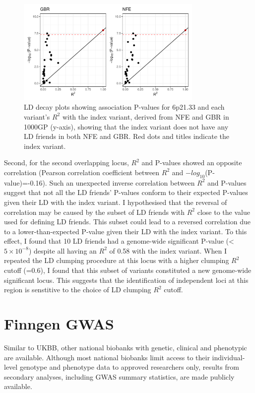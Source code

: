   \begin{figure}[H] 
    \centering    
    \includegraphics[width=0.8\textwidth]{ukbb_ld_decay_nfe_vs_gbr}
    \caption[Figure]{LD decay plots showing association P-values for 6p21.33 and each variant's $R^{2}$ with the index variant, derived from NFE and GBR in 1000GP (y-axis), showing that the index variant does not have any LD friends in both NFE and GBR. Red dots and titles indicate the index variant.}
    \label{fig:ukbb_ld_decay_nfe_vs_gbr}
    \end{figure}

  Second, for the second overlapping locus, $R^{2}$ and P-values showed an opposite correlation (Pearson correlation coefficient between $R^{2}$ and $-log_{10}$(P-value)=-0.16). Such an unexpected inverse correlation between $R^{2}$ and P-values suggest that not all the LD friends' P-values conform to their expected P-values given their LD with the index variant. I hypothesised that the reversal of correlation may be caused by the subset of LD friends with $R^{2}$ close to the value used for defining LD friends. This subset could lead to a reversed correlation due to a lower-than-expected P-value given their LD with the index variant. To this effect, I found that 10 LD friends had a genome-wide significant P-value (< $5\times10^{-8}$) despite all having an $R^{2}$ of 0.58 with the index variant. When I repeated the LD clumping procedure at this locus with a higher clumping $R^{2}$ cutoff (=0.6), I found that this subset of variants constituted a new genome-wide significant locus. This suggests that the identification of independent loci at this region is senstitive to the choice of LD clumping $R^{2}$ cutoff. 
  

  



      \section{Finngen GWAS}
      Similar to UKBB, other national biobanks with genetic, clinical and phenotypic are available. Although most national biobanks limit access to their individual-level genotype and phenotype data to approved researchers only, results from secondary analyses, including GWAS summary statistics, are made publicly available. \\

